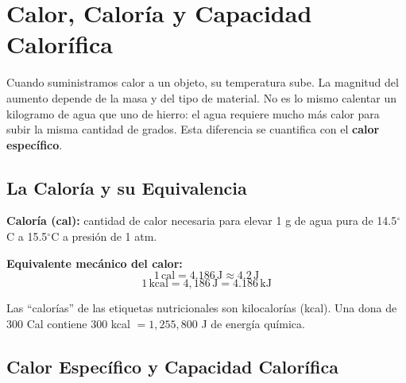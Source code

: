 \section{Calor, Caloría y Capacidad Calorífica}

\begin{seccion}
Cuando suministramos calor a un objeto, su temperatura sube. La magnitud del aumento depende de la masa y del tipo de material. No es lo mismo calentar un kilogramo de agua que uno de hierro: el agua requiere mucho más calor para subir la misma cantidad de grados. Esta diferencia se cuantifica con el \textbf{calor específico}.
\end{seccion}

\subsection{La Caloría y su Equivalencia}

\begin{seccion}
\begin{definicion}
\textbf{Caloría (cal):} cantidad de calor necesaria para elevar 1 g de agua pura de 14.5$^\circ$C a 15.5$^\circ$C a presión de 1 atm.
\end{definicion}

\begin{ecuacion}
\textbf{Equivalente mecánico del calor:}
$$1\,\text{cal} = 4.186\,\text{J} \approx 4.2\,\text{J}$$
$$1\,\text{kcal} = 4{,}186\,\text{J} = 4.186\,\text{kJ}$$
\end{ecuacion}

\begin{nota}
Las ``calorías'' de las etiquetas nutricionales son kilocalorías (kcal). Una dona de 300 Cal contiene 300 kcal $= 1{,}255{,}800$ J de energía química.
\end{nota}
\end{seccion}

\subsection{Calor Específico y Capacidad Calorífica}


